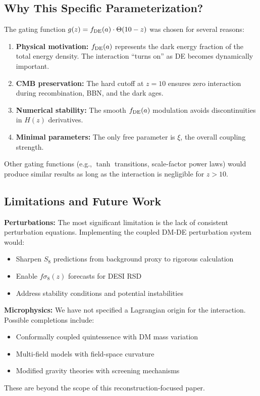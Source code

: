 \documentclass[twocolumn,showpacs,preprintnumbers,amsmath,amssymb,prd]{revtex4-2}
\begin{document}
\subsection{Why This Specific Parameterization?}

The gating function $g(z) = f_{\rm DE}(a) \cdot \Theta(10 - z)$ was chosen for several reasons:
\begin{enumerate}
    \item \textbf{Physical motivation:} $f_{\rm DE}(a)$ represents the dark energy fraction of the total energy density. The interaction ``turns on'' as DE becomes dynamically important.
    \item \textbf{CMB preservation:} The hard cutoff at $z = 10$ ensures zero interaction during recombination, BBN, and the dark ages.
    \item \textbf{Numerical stability:} The smooth $f_{\rm DE}(a)$ modulation avoids discontinuities in $H(z)$ derivatives.
    \item \textbf{Minimal parameters:} The only free parameter is $\xi$, the overall coupling strength.
\end{enumerate}

Other gating functions (e.g., $\tanh$ transitions, scale-factor power laws) would produce similar results as long as the interaction is negligible for $z > 10$.

\subsection{Limitations and Future Work}

\textbf{Perturbations:} The most significant limitation is the lack of consistent perturbation equations. Implementing the coupled DM-DE perturbation system would:
\begin{itemize}
    \item Sharpen $S_8$ predictions from background proxy to rigorous calculation
    \item Enable $f\sigma_8(z)$ forecasts for DESI RSD
    \item Address stability conditions and potential instabilities
\end{itemize}

\textbf{Microphysics:} We have not specified a Lagrangian origin for the interaction. Possible completions include:
\begin{itemize}
    \item Conformally coupled quintessence with DM mass variation
    \item Multi-field models with field-space curvature
    \item Modified gravity theories with screening mechanisms
\end{itemize}
These are beyond the scope of this reconstruction-focused paper.
\end{document}
